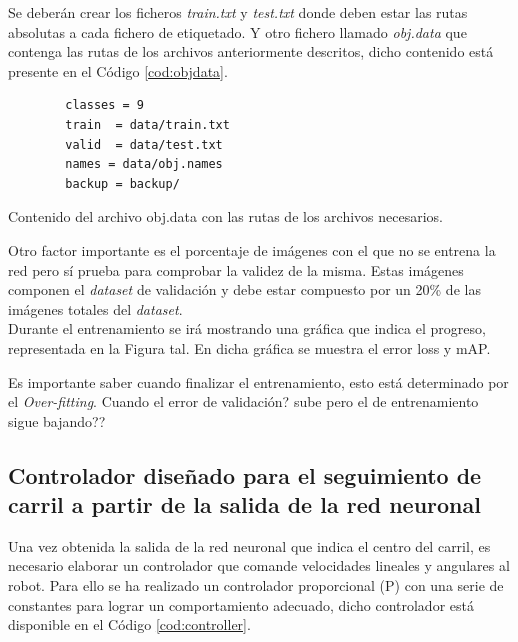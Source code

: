 Se deberán crear los ficheros \textit{train.txt} y \textit{test.txt} donde deben estar las rutas absolutas a cada fichero de etiquetado. Y otro fichero llamado \textit{obj.data} que contenga las rutas de los archivos anteriormente descritos, dicho contenido está presente en el Código \ref{cod:objdata}.\\

\begin{code}[h]
	\begin{lstlisting}
		classes = 9
		train  = data/train.txt
		valid  = data/test.txt
		names = data/obj.names
		backup = backup/
	\end{lstlisting}
	\caption[Contenido del archivo obj.data con las rutas de los archivos necesarios.]{Contenido del archivo obj.data con las rutas de los archivos necesarios.}
	\label{cod:objdata}
\end{code}

Otro factor importante es el porcentaje de imágenes con el que no se entrena la red pero sí prueba para comprobar la validez de la misma. Estas imágenes componen el \textit{dataset} de validación y debe estar compuesto por un 20\% de las imágenes totales del \textit{dataset}.\\

Durante el entrenamiento se irá mostrando una gráfica que indica el progreso, representada en la Figura tal. En dicha gráfica se muestra el error loss y mAP.

Es importante saber cuando finalizar el entrenamiento, esto está determinado por el \textit{Over-fitting}. Cuando el error de validación? sube pero el de entrenamiento sigue bajando??


\subsection{Controlador diseñado para el seguimiento de carril a partir de la salida de la red neuronal}
Una vez obtenida la salida de la red neuronal que indica el centro del carril, es necesario elaborar un controlador que comande velocidades lineales y angulares al robot. Para ello se ha realizado un controlador proporcional (P) con una serie de constantes para lograr un comportamiento adecuado, dicho controlador está disponible en el Código \ref{cod:controller}.\\ 

